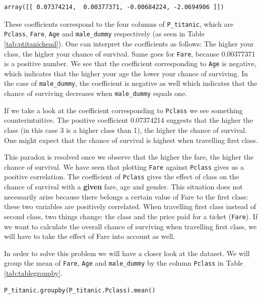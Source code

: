 \documentclass[11pt]{article}
\begin{document}
\begin{verbatim}
array([[ 0.07374214,  0.00377371, -0.00684224, -2.0694906 ]])
\end{verbatim}


These coefficients correspond to the four columns of  \texttt{P\_titanic}, which are \texttt{Pclass}, \texttt{Fare}, \texttt{Age} and \texttt{male\_dummy} respectively (as seen in Table \ref{tab:ptitanichead}). One can interpret the coefficients as follows: The higher your class, the higher your chance of survival. Same goes for \texttt{Fare}, because 0.00377371 is a positive number. We see that the coefficient corresponding to \texttt{Age} is negative, which indicates that the higher your age the lower your chance of surviving. In the case of \texttt{male\_dummy}, the coefficient is negative as well which indicates that the chance of surviving decreases when \texttt{male\_dummy} equals one. 

If we take a look at the coefficient corresponding to \texttt{Pclass} we see something counterintuitive. The positive coefficient 0.07374214 suggests that the higher the class (in this case 3 is a higher class than 1), the higher the chance of survival. One might expect that the chance of survival is highest when travelling first class.

This paradox is resolved once we observe that the higher the fare, the higher the chance of survival. We have seen that plotting \texttt{Fare} against \texttt{Pclass} gives us a positive correlation. The coefficient of \texttt{Pclass} gives the effect of class on the chance of survival with a \textbf{given} fare, age and gender. This situation does not necessarily arise because there belongs a certain value of Fare to the first class: these two variables are positively correlated. When travelling first class instead of second class, two things change: the class and the price paid for a ticket (\texttt{Fare}). If we want to calculate the overall chance of surviving when travelling first class, we will have to take the effect of Fare into account as well.  

In order to solve this problem we will have a closer look at the dataset. We will group the mean of  \texttt{Fare}, \texttt{Age} and \texttt{male\_dummy} by the column \texttt{Pclass} in Table \ref{tab:tablegroupby}. 

\begin{verbatim}
P_titanic.groupby(P_titanic.Pclass).mean()
\end{verbatim}
\end{document}
